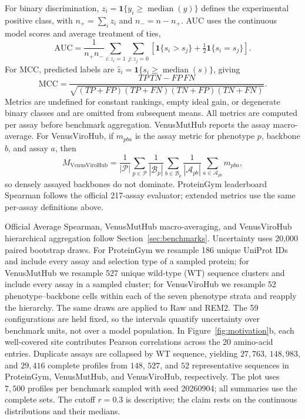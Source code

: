 \documentclass{article} %
\begin{document}
For binary discrimination, $z_i=\mathbf{1}\{y_i\ge\operatorname{median}(y)\}$ defines the experimental positive class, with $n_+=\sum_i z_i$ and $n_-=n-n_+$. AUC uses the continuous model scores and average treatment of ties,
\begin{equation}
\mathrm{AUC}=\frac{1}{n_+n_-}\sum_{i:z_i=1}\sum_{j:z_j=0}
\left[\mathbf{1}\{s_i>s_j\}+\tfrac12\mathbf{1}\{s_i=s_j\}\right].
\label{eq:metric_auc}
\end{equation}
For MCC, predicted labels are $\hat z_i=\mathbf{1}\{s_i\ge\operatorname{median}(s)\}$, giving
\begin{equation}
\mathrm{MCC}=\frac{TP\,TN-FP\,FN}
{\sqrt{(TP+FP)(TP+FN)(TN+FP)(TN+FN)}}.
\label{eq:metric_mcc}
\end{equation}
Metrics are undefined for constant rankings, empty ideal gain, or degenerate binary classes and are omitted from subsequent means. All metrics are computed per assay before benchmark aggregation. VenusMutHub reports the assay macro-average. For VenusViroHub, if $m_{pba}$ is the assay metric for phenotype $p$, backbone $b$, and assay $a$, then
\begin{equation}
M_{\mathrm{VenusViroHub}}=\frac{1}{|\mathcal P|}\sum_{p\in\mathcal P}
\frac{1}{|\mathcal B_p|}\sum_{b\in\mathcal B_p}
\frac{1}{|\mathcal A_{pb}|}\sum_{a\in\mathcal A_{pb}}m_{pba},
\label{eq:virogym_aggregation}
\end{equation}
so densely assayed backbones do not dominate. ProteinGym leaderboard Spearman follows the official 217-assay evaluator; extended metrics use the same per-assay definitions above.

Official Average Spearman, VenusMutHub macro-averaging, and VenusViroHub hierarchical aggregation follow Section~\ref{sec:benchmarks}. Uncertainty uses 20{,}000 paired bootstrap draws. For ProteinGym we resample 186 unique UniProt IDs and include every assay and selection type of a sampled protein; for VenusMutHub we resample 527 unique wild-type (WT) sequence clusters and include every assay in a sampled cluster; for VenusViroHub we resample 52 phenotype--backbone cells within each of the seven phenotype strata and reapply the hierarchy. The same draws are applied to Raw and \textsc{REM2}. The 59 configurations are held fixed, so the intervals quantify uncertainty over benchmark units, not over a model population. In Figure~\ref{fig:motivation}b, each well-covered site contributes Pearson correlations across the 20 amino-acid entries. Duplicate assays are collapsed by WT sequence, yielding $27{,}763$, $148{,}983$, and $29{,}416$ complete profiles from $148$, $527$, and $52$ representative sequences in ProteinGym, VenusMutHub, and VenusViroHub, respectively. The plot uses $7{,}500$ profiles per benchmark sampled with seed 20260904; all summaries use the complete sets. The cutoff $r=0.3$ is descriptive; the claim rests on the continuous distributions and their medians.
\end{document}
